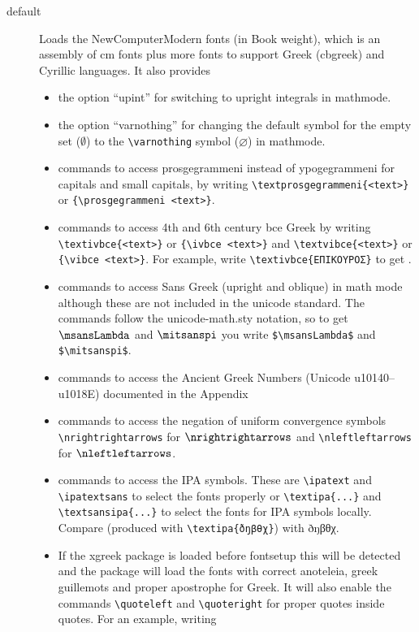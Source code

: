 \documentclass{book}
\newcommand\quoteleft{\char"201C}
\newcommand\quoteright{\char"201E}
\begin{document}
  \begin{description}
  \item[default] Loads the NewComputerModern fonts (in Book weight),
    which is an assembly of cm fonts plus
    more fonts to support Greek (cbgreek) and Cyrillic languages. It also provides
    \begin{itemize}
    \item the option ``upint'' for switching to upright integrals in mathmode.
    \item the option ``varnothing'' for changing the default symbol for
      the empty set ($\emptyset$) to the \verb|\varnothing| symbol ($\varnothing$) in mathmode.
      \item commands to access prosgegrammeni instead of ypogegrammeni for capitals and small
        capitals, by writing \verb|\textprosgegrammeni{<text>}| or \verb|{\prosgegrammeni <text>}|.
      \item commands to access 4th and 6th century bce Greek by writing
        \verb|\textivbce{<text>}| or \verb|{\ivbce <text>}| and
        \verb|\textvibce{<text>}| or \verb|{\vibce <text>}|. For example, write
        \verb|\textivbce{ΕΠΙΚΟΥΡΟΣ}| to get .
      \item commands to access Sans Greek (upright and oblique) in math mode although these are
        not included in the unicode standard. The commands follow the unicode-math.sty notation, so
        to get $\msansLambda$ and $\mitsanspi$ you write \verb|$\msansLambda$| and \verb|$\mitsanspi$|.
      \item commands to access the Ancient Greek Numbers (Unicode u10140--u1018E)
        documented in the Appendix
      \item commands to access the negation of uniform convergence symbols \verb|\nrightrightarrows|
        for $\nrightrightarrows$ and \verb|\nleftleftarrows| for $\nleftleftarrows$.
      \item commands to access the IPA symbols. These are \verb|\ipatext| and \verb|\ipatextsans|
        to select the fonts properly or \verb|\textipa{...}| and \verb|\textsansipa{...}| to select the fonts
        for IPA symbols locally. Compare 
        (produced with \verb|\textipa{ðŋβθχ}|) with ðŋβθχ.
      \item If the xgreek package is loaded before fontsetup this will be detected and the package
        will load the fonts with correct anoteleia, greek guillemots and proper apostrophe for
        Greek. It will also enable the commands \verb|\quoteleft| and \verb|\quoteright| for proper
        quotes inside quotes. For an example, writing


\end{itemize}
\end{description}
\end{document}
